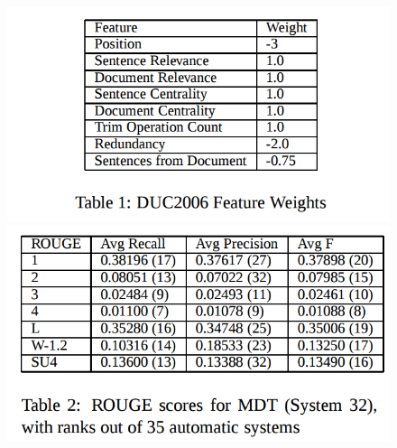 \documentclass[xcolor={table}]{beamer}
\begin{document}
\begin{frame}[t]{\cite{zajic2006sentence}}
      \begin{figure}[h]
          \centering
      \includegraphics[scale=.25]{images/table1-zajic06.png} \\
      \includegraphics[scale=.25]{images/table2-zajic06.png} \\
  \end{figure}
\end{frame}
\end{document}
